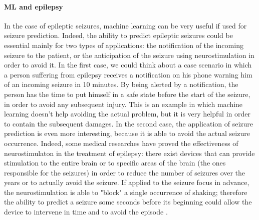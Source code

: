 \paragraph{ML and epilepsy} In the case of epileptic seizures, machine learning can be very useful if used for seizure prediction. Indeed, the ability to predict epileptic seizures could be essential mainly for two types of applications: the notification of the incoming seizure to the patient, or the anticipation of the seizure using neurostimulation in order to avoid it. In the first case, we could think about a case scenario in which a person suffering from epilepsy receives a notification on his phone warning him of an incoming seizure in 10 minutes. By being alerted by a notification, the person has the time to put himself in a safe state before the start of the seizure, in order to avoid any subsequent injury. This is an example in which machine learning doesn't help avoiding the actual problem, but it is very helpful in order to contain the subsequent damages. In the second case, the application of seizure prediction is even more interesting, because it is able to avoid the actual seizure occurrence. Indeed, some medical researches \cite{NCBI:Neurostimulation} have proved the effectiveness of neurostimulaton in the treatment of epilepsy: there exist devices that can provide stimulation to the entire brain or to specific areas of the brain (the ones responsible for the seizures) in order to reduce the number of seizures over the years or to actually avoid the seizure. If applied to the seizure focus in advance, the neurostimulation is able to "block" a single occurrence of shaking; therefore the ability to predict a seizure some seconds before its beginning could allow the device to intervene in time and to avoid the episode \cite{EF:Neurostimulation}.

